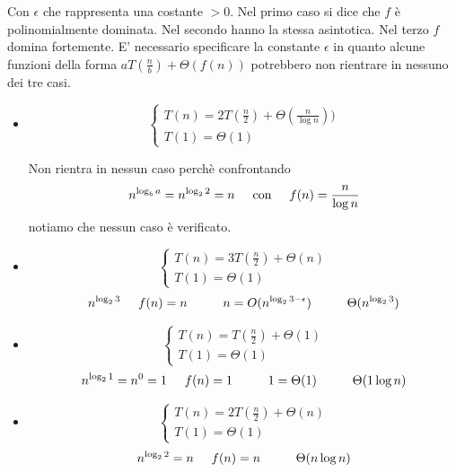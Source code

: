Con $\epsilon$ che rappresenta una costante $>0$. Nel primo caso si dice che $f$ è polinomialmente dominata. Nel secondo hanno la stessa asintotica. Nel terzo $f$ domina fortemente. E' necessario specificare la constante $\epsilon$ in quanto alcune funzioni della forma $aT(\frac{n}{b}) + \Theta(f(n))$ potrebbero non rientrare in nessuno dei tre casi.

\begin{example}\phantom{}
    \begin{itemize}
        \item $$\begin{cases}T(n) = 2T(\frac{n}{2}) + \Theta(\frac{n}{\log n}))\\T(1) = \Theta(1)\end{cases}$$
        
        Non rientra in nessun caso perchè confrontando
        \begin{equation*}
            n^{\log_ba}=n^{\log_22}=n\hspace{0.5cm}\text{con}\hspace{0.5cm}f(n)=\frac{n}{\log n}
        \end{equation*}
        notiamo che nessun caso è verificato.
        
        \item $$\begin{cases}T(n) = 3T(\frac{n}{2}) + \Theta(n)\\T(1) = \Theta(1)\end{cases}$$
        \begin{equation*}
            n^{\log_23}\hspace{0.5cm}f(n)=n\hspace{1cm}n=O(n^{\log_23-\epsilon})\hspace{1cm}\Theta(n^{\log_23})
        \end{equation*}
        
        \item $$\begin{cases}T(n) = T(\frac{n}{2}) + \Theta(1)\\T(1) = \Theta(1)\end{cases}$$
        \begin{equation*}
            n^{\log_21}=n^0=1\hspace{0.5cm}f(n)=1\hspace{1cm}1=\Theta(1)\hspace{1cm}\Theta(1\log n)
        \end{equation*}
        
        \item $$\begin{cases}T(n) = 2T(\frac{n}{2}) + \Theta(n)\\T(1) = \Theta(1)\end{cases}$$
        \begin{equation*}
            n^{\log_22}=n\hspace{0.5cm}f(n)=n\hspace{1cm}\Theta(n\log n)
        \end{equation*}
        
    \end{itemize}
\end{example}


